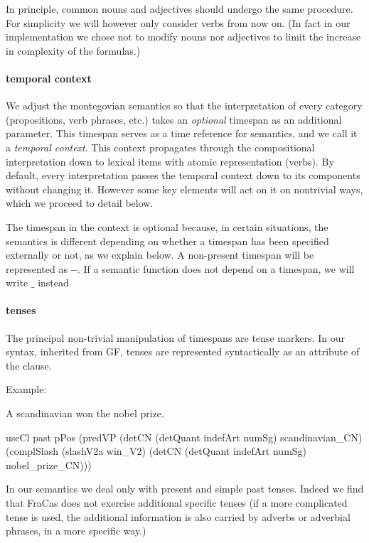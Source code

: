 \documentclass[a4paper,11pt]{article}
\newcommand\jp[1]{\todo[backgroundcolor=blue!10]{JP: #1}}
\begin{document}
In principle, common nouns and adjectives should undergo the same
procedure. For simplicity we will however only consider verbs from now
on. (In fact in our implementation we chose not to modify nouns nor
adjectives to limit the increase in complexity of the formulas.)

\paragraph{temporal context}

We adjust the montegovian semantics so that the interpretation of
every category (propositions, verb phrases, etc.) takes an
\emph{optional} timespan as an additional parameter. This timespan
serves as a time reference for semantics, and we call it a
\emph{temporal context}. This context propagates through the
compositional interpretation down to lexical items with atomic
representation (verbs). By default, every interpretation passes the
temporal context down to its components without changing it. However
some key elements will act on it on nontrivial ways, which we proceed
to detail below.

\newcommand\nospan{\ensuremath{─}}
\newcommand\anyspan{\ensuremath{\_}}
The timespan in the context is
optional because, in certain situations, the semantics is different
depending on whether a timespan has been specified externally or not,
as we explain below. A non-present timespan will be represented as
\nospan{}. If a semantic function does not depend on a timespan, we will write \anyspan{} instead

\paragraph{tenses}

The principal non-trivial manipulation of timespans are tense
markers. In our syntax, inherited from GF, tenses are represented
syntactically as an attribute of the clause.

Example:

A scandinavian won the nobel prize.

useCl past pPos (predVP (detCN (detQuant indefArt numSg) scandinavian\_CN) (complSlash (slashV2a win\_V2) (detCN (detQuant indefArt numSg) nobel\_prize\_CN)))

In our semantics we deal only with present and simple past
tenses. \jp{Is this enough for theory?} Indeed we find that FraCas does not exercise additional
specific tenses (if a more complicated tense is used, the additional
information is also carried by adverbs or adverbial phrases, in a more
specific way.)
\end{document}
